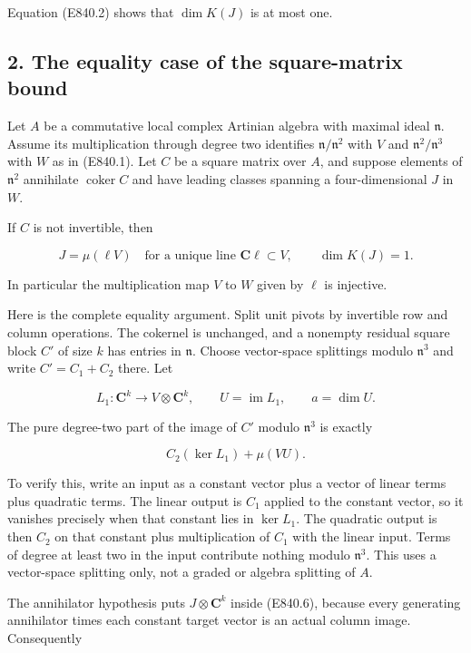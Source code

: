 Equation (E840.2) shows that \(\dim K(J)\) is at most one.

\subsection{2. The equality case of the square-matrix
bound}\label{SF-E840:the-equality-case-of-the-square-matrix-bound}

Let \(A\) be a commutative local complex Artinian algebra with maximal
ideal \(\mathfrak n\). Assume its multiplication through degree two
identifies \(\mathfrak n/\mathfrak n^2\) with \(V\) and
\(\mathfrak n^2/\mathfrak n^3\) with \(W\) as in (E840.1). Let \(C\) be
a square matrix over \(A\), and suppose elements of \(\mathfrak n^2\)
annihilate \(\operatorname{coker}C\) and have leading classes spanning a
four-dimensional \(J\) in \(W\).

If \(C\) is not invertible, then

\[
                   J=\mu(\ell V)
       \quad\text{for a unique line }\mathbf C\ell\subset V,
       \qquad \dim K(J)=1.
 \tag{E840.4}
\]

In particular the multiplication map \(V\) to \(W\) given by \(\ell\) is
injective.

Here is the complete equality argument. Split unit pivots by invertible
row and column operations. The cokernel is unchanged, and a nonempty
residual square block \(C'\) of size \(k\) has entries in
\(\mathfrak n\). Choose vector-space splittings modulo \(\mathfrak n^3\)
and write \(C'=C_1+C_2\) there. Let

\[
 L_1:\mathbf C^k\longrightarrow V\otimes\mathbf C^k,
 \qquad U=\operatorname{im}L_1,\qquad a=\dim U.
 \tag{E840.5}
\]

The pure degree-two part of the image of \(C'\) modulo \(\mathfrak n^3\)
is exactly

\[
             C_2(\ker L_1)+\mu(VU).
 \tag{E840.6}
\]

To verify this, write an input as a constant vector plus a vector of
linear terms plus quadratic terms. The linear output is \(C_1\) applied
to the constant vector, so it vanishes precisely when that constant lies
in \(\ker L_1\). The quadratic output is then \(C_2\) on that constant
plus multiplication of \(C_1\) with the linear input. Terms of degree at
least two in the input contribute nothing modulo \(\mathfrak n^3\). This
uses a vector-space splitting only, not a graded or algebra splitting of
\(A\).

The annihilator hypothesis puts \(J\otimes\mathbf C^k\) inside (E840.6),
because every generating annihilator times each constant target vector
is an actual column image. Consequently

